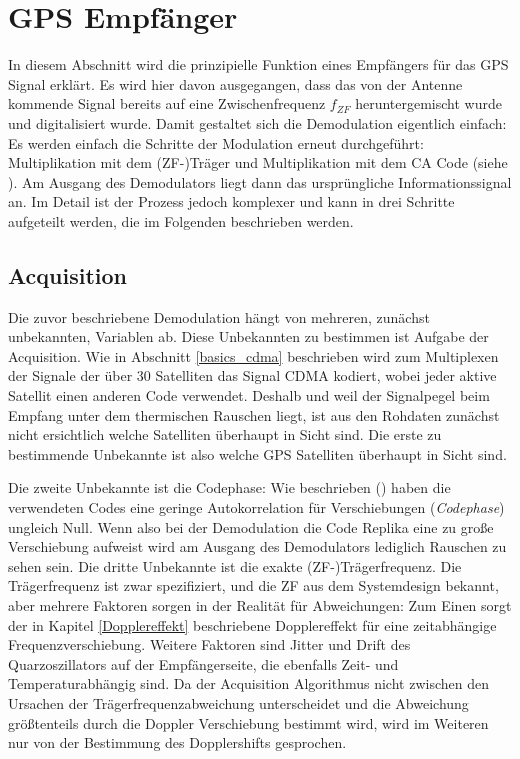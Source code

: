 \section{GPS Empfänger}
In diesem Abschnitt wird die prinzipielle Funktion eines Empfängers für das GPS Signal erklärt. Es wird hier davon ausgegangen, dass das von der Antenne kommende Signal bereits auf eine Zwischenfrequenz $f_{ZF}$ heruntergemischt wurde und digitalisiert wurde. Damit gestaltet sich die Demodulation eigentlich einfach: Es werden einfach die Schritte der Modulation erneut durchgeführt: Multiplikation mit dem (ZF-)Träger und Multiplikation mit dem CA Code (siehe ). Am Ausgang des Demodulators liegt dann das ursprüngliche Informationssignal an. Im Detail ist der Prozess jedoch komplexer und kann in drei Schritte aufgeteilt werden, die im Folgenden beschrieben werden.

\subsection{Acquisition}
\label{Grundlagen_Acquisition}
Die zuvor beschriebene Demodulation hängt von mehreren, zunächst unbekannten, Variablen ab. Diese Unbekannten zu bestimmen ist Aufgabe der Acquisition.
Wie in Abschnitt \ref{basics_cdma} beschrieben wird zum Multiplexen der Signale der über 30 Satelliten das Signal CDMA kodiert, wobei jeder aktive Satellit einen anderen Code verwendet. Deshalb und weil der Signalpegel beim Empfang unter dem thermischen Rauschen liegt, ist aus den Rohdaten zunächst nicht ersichtlich welche Satelliten überhaupt in Sicht sind. Die erste zu bestimmende Unbekannte ist also welche GPS Satelliten überhaupt in Sicht sind.

Die zweite Unbekannte ist die \gls{Codephase}: Wie beschrieben () haben die verwendeten Codes eine geringe Autokorrelation für Verschiebungen (\emph{Codephase}) ungleich Null. Wenn also bei der Demodulation die Code Replika eine zu große Verschiebung aufweist wird am Ausgang des Demodulators lediglich Rauschen zu sehen sein.
Die dritte Unbekannte ist die exakte (ZF-)Trägerfrequenz. Die Trägerfrequenz ist zwar spezifiziert, und die ZF aus dem Systemdesign bekannt, aber mehrere Faktoren sorgen in der Realität für Abweichungen: Zum Einen sorgt der in Kapitel \ref{Dopplereffekt} beschriebene Dopplereffekt für eine zeitabhängige Frequenzverschiebung. Weitere Faktoren sind Jitter und Drift des Quarzoszillators auf der Empfängerseite, die ebenfalls Zeit- und Temperaturabhängig sind. Da der Acquisition Algorithmus nicht zwischen den Ursachen der Trägerfrequenzabweichung unterscheidet und die Abweichung größtenteils durch die Doppler Verschiebung bestimmt wird, wird im Weiteren nur von der Bestimmung des Dopplershifts gesprochen. 

